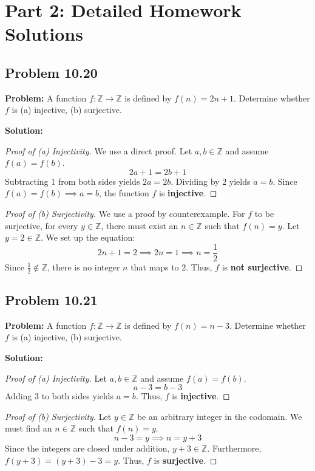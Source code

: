 \documentclass[11pt, a4paper]{article}
\theoremstyle{definition}
\theoremstyle{remark}
\newcommand{\Z}{\mathbb{Z}}
\begin{document}
\newpage
\section{Part 2: Detailed Homework Solutions}

\subsection{Problem 10.20}
\textbf{Problem:} A function $f: \Z \to \Z$ is defined by $f(n) = 2n + 1$. Determine whether $f$ is (a) injective, (b) surjective.

\textbf{Solution:}
\begin{proof}[Proof of (a) Injectivity]
We use a direct proof. Let $a, b \in \Z$ and assume $f(a) = f(b)$. 
\[ 2a + 1 = 2b + 1 \]
Subtracting $1$ from both sides yields $2a = 2b$. Dividing by $2$ yields $a = b$. 
Since $f(a) = f(b) \implies a = b$, the function $f$ is \textbf{injective}.
\end{proof}

\begin{proof}[Proof of (b) Surjectivity]
We use a proof by counterexample. For $f$ to be surjective, for every $y \in \Z$, there must exist an $n \in \Z$ such that $f(n) = y$. 
Let $y = 2 \in \Z$. We set up the equation:
\[ 2n + 1 = 2 \implies 2n = 1 \implies n = \frac{1}{2} \]
Since $\frac{1}{2} \notin \Z$, there is no integer $n$ that maps to $2$. Thus, $f$ is \textbf{not surjective}.
\end{proof}

\subsection{Problem 10.21}
\textbf{Problem:} A function $f: \Z \to \Z$ is defined by $f(n) = n - 3$. Determine whether $f$ is (a) injective, (b) surjective.

\textbf{Solution:}
\begin{proof}[Proof of (a) Injectivity]
Let $a, b \in \Z$ and assume $f(a) = f(b)$. 
\[ a - 3 = b - 3 \]
Adding $3$ to both sides yields $a = b$. Thus, $f$ is \textbf{injective}.
\end{proof}

\begin{proof}[Proof of (b) Surjectivity]
Let $y \in \Z$ be an arbitrary integer in the codomain. We must find an $n \in \Z$ such that $f(n) = y$.
\[ n - 3 = y \implies n = y + 3 \]
Since the integers are closed under addition, $y + 3 \in \Z$. Furthermore, $f(y+3) = (y+3) - 3 = y$. Thus, $f$ is \textbf{surjective}.
\end{proof}
\end{document}

